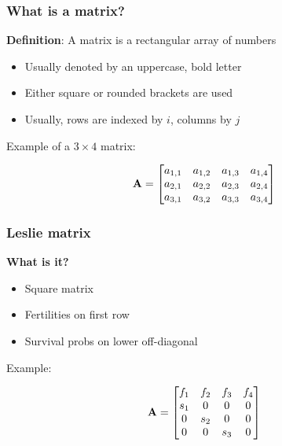 \documentclass[color=usenames,dvipsnames]{beamer}\usepackage[]{graphicx}\usepackage[]{color}
\begin{document}
\begin{frame}
  \frametitle{What is a matrix?}
  {\bf Definition}: A matrix is a rectangular array of numbers
  \begin{itemize}
    \item Usually denoted by an uppercase, bold letter
    \item Either square or rounded brackets are used
    \item Usually, rows are indexed by $i$, columns by $j$
  \end{itemize}
  \pause

  \vspace{1cm}
  Example of a $3 \times 4$ matrix: \par
  \begin{center}
    \Large
    \[
    { \bf A} =
    \begin{bmatrix}
      a_{1,1} & a_{1,2} & a_{1,3} & a_{1,4} \\
      a_{2,1} & a_{2,2} & a_{2,3} & a_{2,4} \\
      a_{3,1} & a_{3,2} & a_{3,3} & a_{3,4}
    \end{bmatrix}
    \]
  \end{center}
\end{frame}


\begin{frame}
  \frametitle{Leslie matrix}
  \large
  {\bf What is it?}
  \begin{itemize}
    \item Square matrix %
    \item Fertilities on first row
    \item Survival probs on lower off-diagonal
  \end{itemize}
  \pause
  \vspace{.8cm}
  Example:
  \large
  \begin{center}
    \[
    {\bf A} =
    \begin{bmatrix}
      f_1 & f_2 & f_3 & f_4 \\
      s_1 & 0 & 0 & 0 \\
      0 & s_2 & 0 & 0 \\
      0 & 0 & s_3 & 0
    \end{bmatrix}
    \]
  \end{center}
\end{frame}






\end{document}
